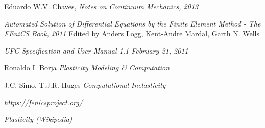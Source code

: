 \begin{thebibliography}{9}
	Eduardo W.V. Chaves,
	\textit{Notes on Continuum Mechanics, 2013}
	
	\textit{Automated Solution of Differential
		Equations by the Finite Element
		Method - The FEniCS Book, 2011}
	Edited by Anders Logg, Kent-Andre Mardal, Garth N. Wells
	
	\textit{UFC Specification and User Manual 1.1
		February 21, 2011}
	
	Ronaldo I. Borja
	\textit{Plasticity
		Modeling \& Computation}
	
	J.C. Simo, T.J.R. Huges
	\textit{Computational Inelasticity}
	
	\textit{https://fenicsproject.org/}
	
	\textit{Plasticity (Wikipedia)}
	
\end{thebibliography} 
